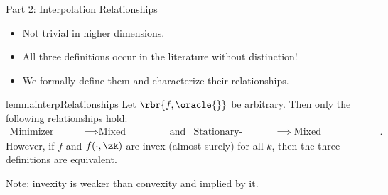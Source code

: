 \documentclass[mathserif,notheorems, hyperref={colorlinks, citecolor=blue, urlcolor=blue, linkcolor=blue}]{beamer}
\def\\{}%
\begin{document}
    \begin{frame}{Part 2: Interpolation Relationships}

        \begin{itemize}
            \item Not trivial in higher dimensions. 
            \item All three definitions occur in the literature without distinction!
            \item We formally define them and characterize their relationships. 
        \end{itemize}

        \pause

        \begin{restatable}{lemma}{interpRelationships}
            Let \( \rbr{f, \oracle{}} \) be arbitrary. 
            Then only the following relationships hold: 
            \begin{align*}
                \text{Minimizer Interpolation} &\implies \text{Mixed Interpolation} \\
                                                                                       & \text{and} &\\
                \text{Stationary-Point Interpolation} &\implies \text{Mixed Interpolation}.
            \end{align*}
            However, if \( f \) and \( f(\cdot, \zk) \) are invex (almost surely) for all \( k \), then the three definitions are equivalent. 
        \end{restatable}

        Note: invexity is weaker than convexity and implied by it. 
        
    \end{frame}
   
\end{document}
